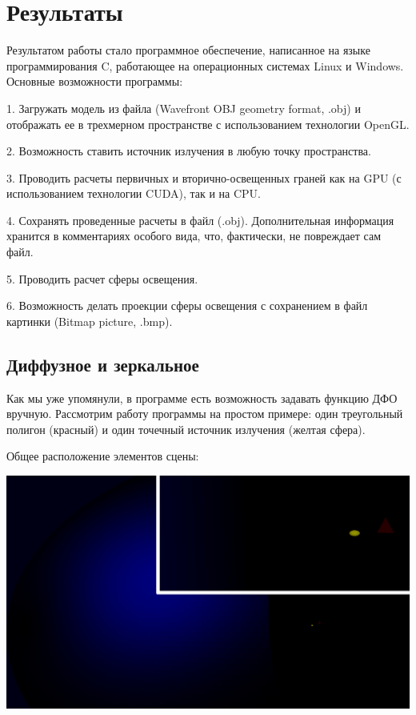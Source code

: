 \newpage
\section*{Результаты} 

Результатом работы стало программное обеспечение, написанное на языке программирования C, работающее на операционных системах Linux и Windows. Основные возможности программы:

1. Загружать модель из файла (Wavefront OBJ geometry format, .obj) и отображать ее в трехмерном пространстве с использованием технологии OpenGL.

2. Возможность ставить источник излучения в любую точку пространства.

3. Проводить расчеты первичных и вторично-освещенных граней как на GPU (с использованием технологии CUDA), так и на CPU.

4. Сохранять проведенные расчеты в файл (.obj). Дополнительная информация хранится в комментариях особого вида, что, фактически, не повреждает сам файл.

5. Проводить расчет сферы освещения.

6. Возможность делать проекции сферы освещения с сохранением в файл картинки (Bitmap picture, .bmp).

\subsection*{Диффузное и зеркальное}

Как мы уже упомянули, в программе есть возможность задавать функцию ДФО вручную. Рассмотрим работу программы на простом примере: один треугольный полигон (красный) и один точечный источник излучения (желтая сфера). 

Общее расположение элементов сцены:

\includegraphics[width=1\linewidth]{common-lambert-zerkalo-screen.png}

